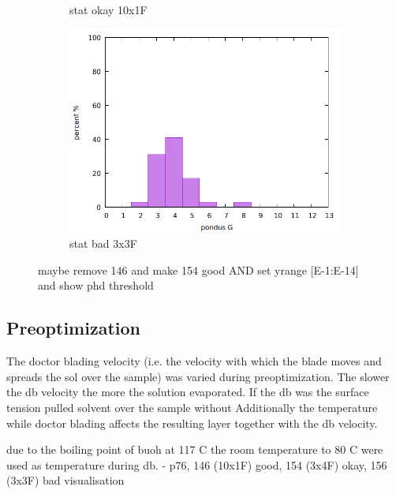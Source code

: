\begin{figure}
\begin{subfigure}{.3\textwidth}
        \caption{stat okay 10x1F} \label{fig:stat1}
    \end{subfigure}
    \begin{subfigure}{.3\textwidth}
        \includegraphics[width=\textwidth]{Pics/iv/stat-156-bad-3x3F.png}
        \caption{stat bad 3x3F} \label{fig:stat3}
    \end{subfigure}
    \caption{maybe remove 146 and make 154 good AND set yrange [E-1:E-14] and show phd threshold} \label{fig:iv}
\end{figure}

\subsection{Preoptimization}
The doctor blading velocity (i.e. the velocity with which the blade moves and spreads the sol over the sample) 
was varied during preoptimization. 
The slower the \gls{db} velocity the more  the solution evaporated. 
If the \gls{db} was  the surface tension pulled solvent over the sample without 
Additionally the temperature while doctor blading affects the resulting layer together with the \gls{db} velocity. 

due to the boiling point of \gls{buoh} at 117 C\cite{ncbi1butanol} the room temperature to 80 C were used as temperature during \gls{db}.
- p76, 146 (10x1F) good, 154 (3x4F) okay, 156 (3x3F) bad visualisation

